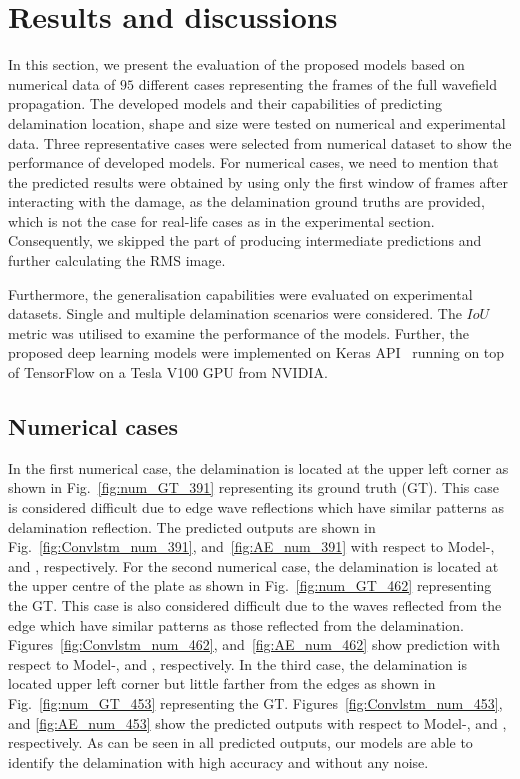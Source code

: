 \section{Results and discussions}
In this section,  we present the evaluation of the proposed models based on numerical data of \(95\) different cases representing the frames of the full wavefield propagation. 
The developed models and their capabilities of predicting delamination location, shape and size were tested on numerical and experimental data.
Three representative cases were selected from numerical dataset to show the performance of developed models.
For numerical cases, we need to mention that the predicted results were obtained by using only the first window of frames after interacting with the damage, as the delamination ground truths are provided, which is not the case for real-life cases as in the experimental section. 
Consequently, we skipped the part of producing intermediate predictions and further calculating the RMS image.

Furthermore, the generalisation capabilities were evaluated on experimental datasets.
Single and multiple delamination scenarios were considered.
The \(IoU\) metric was utilised to examine the performance of the models.
Further, the proposed deep learning models were implemented
on Keras API~\cite{chollet2015keras} running on top of TensorFlow on a Tesla V100 GPU  from NVIDIA. 
\subsection{Numerical cases}
In the first numerical case, the delamination is located at the upper left corner as shown in Fig.~\ref{fig:num_GT_391} representing its ground truth (GT).
This case is considered difficult due to edge wave reflections which have similar patterns as delamination reflection.
The predicted outputs are shown in Fig.~\ref{fig:Convlstm_num_391}, and~\ref{fig:AE_num_391} with respect to Model-, and , respectively.
For the second numerical case, the delamination is located at the upper centre of the plate as shown in Fig.~\ref{fig:num_GT_462} representing the GT.
This case is also considered difficult due to the waves reflected from the edge which have similar patterns as those reflected from the delamination.
Figures~\ref{fig:Convlstm_num_462}, and~\ref{fig:AE_num_462} show prediction with respect to Model-, and , respectively.
In the third case, the delamination is located upper left corner but little farther from the edges as shown in Fig.~\ref{fig:num_GT_453} representing the GT. 
Figures~\ref{fig:Convlstm_num_453}, and \ref{fig:AE_num_453} show the predicted outputs with respect to Model-, and , respectively.
As can be seen in all predicted outputs, our models are able to identify the delamination with high accuracy and without any noise.

